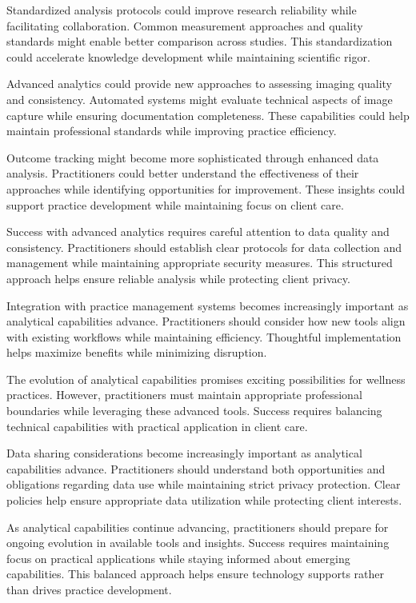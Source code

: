 \documentclass[
  Letterpaper,
]{scrbook}
\begin{document}
Standardized analysis protocols could improve research reliability while
facilitating collaboration. Common measurement approaches and quality
standards might enable better comparison across studies. This
standardization could accelerate knowledge development while maintaining
scientific rigor.

Advanced analytics could provide new approaches to assessing imaging
quality and consistency. Automated systems might evaluate technical
aspects of image capture while ensuring documentation completeness.
These capabilities could help maintain professional standards while
improving practice efficiency.

Outcome tracking might become more sophisticated through enhanced data
analysis. Practitioners could better understand the effectiveness of
their approaches while identifying opportunities for improvement. These
insights could support practice development while maintaining focus on
client care.

Success with advanced analytics requires careful attention to data
quality and consistency. Practitioners should establish clear protocols
for data collection and management while maintaining appropriate
security measures. This structured approach helps ensure reliable
analysis while protecting client privacy.

Integration with practice management systems becomes increasingly
important as analytical capabilities advance. Practitioners should
consider how new tools align with existing workflows while maintaining
efficiency. Thoughtful implementation helps maximize benefits while
minimizing disruption.

The evolution of analytical capabilities promises exciting possibilities
for wellness practices. However, practitioners must maintain appropriate
professional boundaries while leveraging these advanced tools. Success
requires balancing technical capabilities with practical application in
client care.

Data sharing considerations become increasingly important as analytical
capabilities advance. Practitioners should understand both opportunities
and obligations regarding data use while maintaining strict privacy
protection. Clear policies help ensure appropriate data utilization
while protecting client interests.

As analytical capabilities continue advancing, practitioners should
prepare for ongoing evolution in available tools and insights. Success
requires maintaining focus on practical applications while staying
informed about emerging capabilities. This balanced approach helps
ensure technology supports rather than drives practice development.
\end{document}
